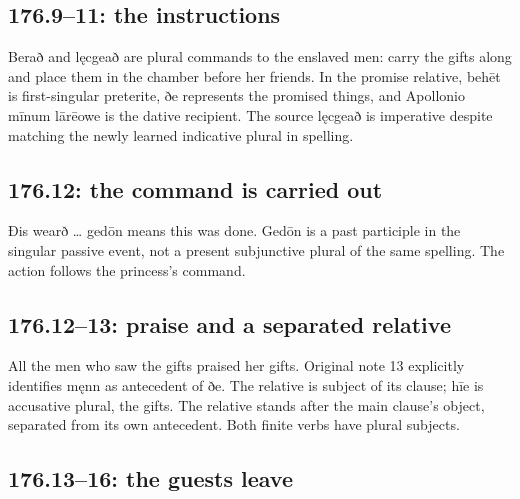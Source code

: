 \subsection*{176.9–11: the instructions}

Berað and lęcgeað are plural commands to the enslaved men: carry the gifts along and place them in the chamber before her friends. In the promise relative, behēt is first-singular preterite, ðe represents the promised things, and Apollonio mīnum lārēowe is the dative recipient. The source lęcgeað is imperative despite matching the newly learned indicative plural in spelling.

\subsection*{176.12: the command is carried out}

Ðis wearð … gedōn means this was done. Gedōn is a past participle in the singular passive event, not a present subjunctive plural of the same spelling. The action follows the princess’s command.

\subsection*{176.12–13: praise and a separated relative}

All the men who saw the gifts praised her gifts. Original note 13 explicitly identifies męnn as antecedent of ðe. The relative is subject of its clause; hīe is accusative plural, the gifts. The relative stands after the main clause’s object, separated from its own antecedent. Both finite verbs have plural subjects.

\subsection*{176.13–16: the guests leave}

